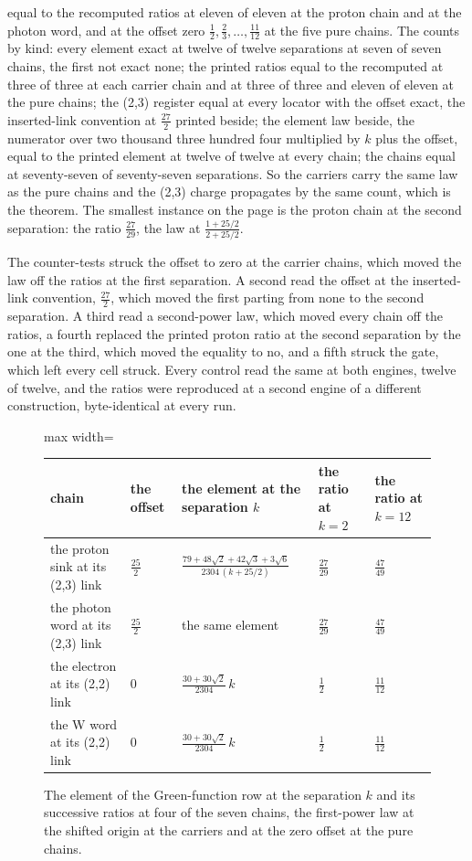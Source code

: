 \begin{chproof}
equal to the recomputed ratios at eleven of eleven at the proton chain and at the photon word, and at the offset zero $\tfrac{1}{2}, \tfrac{2}{3}, \ldots, \tfrac{11}{12}$ at the five pure chains. The counts by kind: every element exact at twelve of twelve separations at seven of seven chains, the first not exact none; the printed ratios equal to the recomputed at three of three at each carrier chain and at three of three and eleven of eleven at the pure chains; the (2,3) register equal at every locator with the offset exact, the inserted-link convention at $\tfrac{27}{2}$ printed beside; the element law beside, the numerator over two thousand three hundred four multiplied by $k$ plus the offset, equal to the printed element at twelve of twelve at every chain; the chains equal at seventy-seven of seventy-seven separations. So the carriers carry the same law as the pure chains and the (2,3) charge propagates by the same count, which is the theorem. The smallest instance on the page is the proton chain at the second separation: the ratio $\tfrac{27}{29}$, the law at $\tfrac{1 + 25/2}{2 + 25/2}$.

The counter-tests struck the offset to zero at the carrier chains, which moved the law off the ratios at the first separation. A second read the offset at the inserted-link convention, $\tfrac{27}{2}$, which moved the first parting from none to the second separation. A third read a second-power law, which moved every chain off the ratios, a fourth replaced the printed proton ratio at the second separation by the one at the third, which moved the equality to no, and a fifth struck the gate, which left every cell struck. Every control read the same at both engines, twelve of twelve, and the ratios were reproduced at a second engine of a different construction, byte-identical at every run.
\end{chproof}
\begin{figure}[h]\centering
\begin{adjustbox}{max width=\linewidth}\begin{tabular}{lllll}\toprule
chain & the offset & the element at the separation $k$ & the ratio at $k = 2$ & the ratio at $k = 12$ \\ \midrule
the proton sink at its (2,3) link & $\tfrac{25}{2}$ & $\tfrac{79 + 48\sqrt{2} + 42\sqrt{3} + 3\sqrt{6}}{2304\,(k + 25/2)}$ & $\tfrac{27}{29}$ & $\tfrac{47}{49}$ \\
the photon word at its (2,3) link & $\tfrac{25}{2}$ & the same element & $\tfrac{27}{29}$ & $\tfrac{47}{49}$ \\
the electron at its (2,2) link & $0$ & $\tfrac{30 + 30\sqrt{2}}{2304}\, k$ & $\tfrac{1}{2}$ & $\tfrac{11}{12}$ \\
the W word at its (2,2) link & $0$ & $\tfrac{30 + 30\sqrt{2}}{2304}\, k$ & $\tfrac{1}{2}$ & $\tfrac{11}{12}$ \\ \bottomrule
\end{tabular}\end{adjustbox}
\caption{The element of the Green-function row at the separation $k$ and its successive ratios at four of the seven chains, the first-power law at the shifted origin at the carriers and at the zero offset at the pure chains.}
\end{figure}
